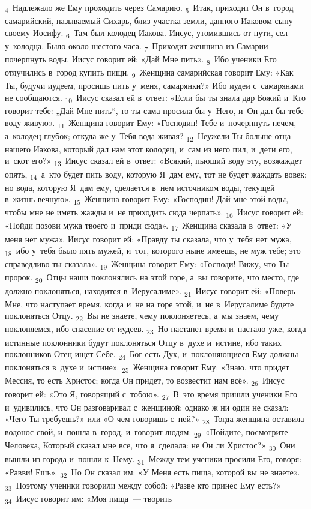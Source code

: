 \documentclass[a4paper,12pt]{article}
\begin{document}
\textsubscript{4}~Надлежало же Ему проходить через Самарию. \textsubscript{5}~Итак, приходит Он в~город самарийский, называемый Сихарь, близ участка земли, данного Иаковом сыну своему Иосифу. \textsubscript{6}~Там был колодец Иакова. Иисус, утомившись от пути, сел у~колодца. Было около шестого часа. \textsubscript{7}~Приходит женщина из Самарии почерпнуть воды. Иисус говорит ей: «Дай Мне пить». \textsubscript{8}~Ибо ученики Его отлучились в~город купить пищи. \textsubscript{9}~Женщина самарийская говорит Ему: «Как Ты, будучи иудеем, просишь пить у~меня, самарянки?» Ибо иудеи с~самарянами не сообщаются. \textsubscript{10}~Иисус сказал ей в~ответ: «Если бы ты знала дар Божий и~Кто говорит тебе: „Дай Мне пить“, то ты сама просила бы у~Него, и~Он дал бы тебе воду живую». \textsubscript{11}~Женщина говорит Ему: «Господин! Тебе и~почерпнуть нечем, а~колодец глубок; откуда же у~Тебя вода живая? \textsubscript{12}~Неужели Ты больше отца нашего Иакова, который дал нам этот колодец, и~сам из него пил, и~дети его, и~скот его?» \textsubscript{13}~Иисус сказал ей в~ответ: «Всякий, пьющий воду эту, возжаждет опять, \textsubscript{14}~а~кто будет пить воду, которую Я~дам ему, тот не будет жаждать вовек; но вода, которую Я~дам ему, сделается в~нем источником воды, текущей в~жизнь вечную». \textsubscript{15}~Женщина говорит Ему: «Господин! Дай мне этой воды, чтобы мне не иметь жажды и~не приходить сюда черпать». \textsubscript{16}~Иисус говорит ей: «Пойди позови мужа твоего и~приди сюда». \textsubscript{17}~Женщина сказала в~ответ: «У меня нет мужа». Иисус говорит ей: «Правду ты сказала, что у~тебя нет мужа, \textsubscript{18}~ибо у~тебя было пять мужей, и~тот, которого ныне имеешь, не муж тебе; это справедливо ты сказала». \textsubscript{19}~Женщина говорит Ему: «Господи! Вижу, что Ты пророк. \textsubscript{20}~Отцы наши поклонялись на этой горе, а~вы говорите, что место, где должно поклоняться, находится в~Иерусалиме». \textsubscript{21}~Иисус говорит ей: «Поверь Мне, что наступает время, когда и~не на горе этой, и~не в~Иерусалиме будете поклоняться Отцу. \textsubscript{22}~Вы не знаете, чему поклоняетесь, а~мы знаем, чему поклоняемся, ибо спасение от иудеев. \textsubscript{23}~Но настанет время и~настало уже, когда истинные поклонники будут поклоняться Отцу в~духе и~истине, ибо таких поклонников Отец ищет Себе. \textsubscript{24}~Бог есть Дух, и~поклоняющиеся Ему должны поклоняться в~духе и~истине». \textsubscript{25}~Женщина говорит Ему: «Знаю, что придет Мессия, то есть Христос; когда Он придет, то возвестит нам всё». \textsubscript{26}~Иисус говорит ей: «Это Я, говорящий с~тобою». \textsubscript{27}~В~это время пришли ученики Его и~удивились, что Он разговаривал с~женщиной; однако ж ни один не сказал: «Чего Ты требуешь?» или «О чем говоришь с~ней?» \textsubscript{28}~Тогда женщина оставила водонос свой, и~пошла в~город, и~говорит людям: \textsubscript{29}~«Пойдите, посмотрите Человека, Который сказал мне все, что я~сделала: не Он ли Христос?» \textsubscript{30}~Они вышли из города и~пошли к~Нему. \textsubscript{31}~Между тем ученики просили Его, говоря: «Равви! Ешь». \textsubscript{32}~Но Он сказал им: «У Меня есть пища, которой вы не знаете». \textsubscript{33}~Поэтому ученики говорили между собой: «Разве кто принес Ему есть?» \textsubscript{34}~Иисус говорит им: «Моя пища~--- творить 
\end{document}
